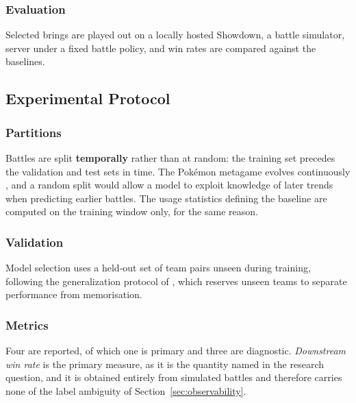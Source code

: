 \documentclass[conference]{IEEEtran}
\begin{document}
\subsubsection{Evaluation} Selected brings are played out on a locally hosted
Showdown, a battle simulator, server under a fixed battle policy, and win rates are compared against
the baselines.

\subsection{Experimental Protocol}
\label{sec:protocol}

\subsubsection{Partitions} Battles are split \textbf{temporally} rather than at random:
the training set precedes the validation and test sets in time. The Pok\'emon
metagame evolves continuously \cite{karten2026}, and a random split would allow
a model to exploit knowledge of later trends when predicting earlier battles.
The usage statistics defining the baseline are computed on the training window
only, for the same reason.

\subsubsection{Validation} Model selection uses a held-out set of team pairs unseen
during training, following the generalization protocol of \cite{angliss2026},
which reserves unseen teams to separate performance from memorisation.

\subsubsection{Metrics} Four are reported, of which one is primary and three are
diagnostic. \emph{Downstream win rate} is the primary measure, as it is the
quantity named in the research question, and it is obtained entirely from
simulated battles and therefore carries none of the label ambiguity of
Section~\ref{sec:observability}.
\end{document}
